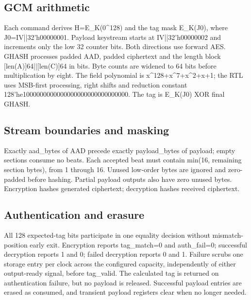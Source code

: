 \documentclass[11pt,a4paper]{article}
\begin{document}
\subsection{GCM arithmetic}

Each command derives H=\allowbreak{}E\_\allowbreak{}K(\allowbreak{}0\textasciicircum{}128)\allowbreak{} and the tag mask E\_\allowbreak{}K(\allowbreak{}J0)\allowbreak{},\allowbreak{} where J0=\allowbreak{}IV||32'h00000001. Payload keystream starts at IV||32'h00000002 and increments only the low 32 counter bits. Both directions use forward AES. GHASH processes padded AAD,\allowbreak{} padded ciphertext and the length block [\allowbreak{}len(\allowbreak{}A)\allowbreak{}]\allowbreak{}64||[\allowbreak{}len(\allowbreak{}C)\allowbreak{}]\allowbreak{}64 in bits. Byte counts are widened to 64 bits before multiplication by eight. The field polynomial is x\textasciicircum{}128+\allowbreak{}x\textasciicircum{}7+\allowbreak{}x\textasciicircum{}2+\allowbreak{}x+\allowbreak{}1; the RTL uses MSB-first processing,\allowbreak{} right shifts and reduction constant 128'he1000000000000000000000000000000. The tag is E\_\allowbreak{}K(\allowbreak{}J0)\allowbreak{} XOR final GHASH.

\subsection{Stream boundaries and masking}

Exactly aad\_\allowbreak{}bytes of AAD precede exactly payload\_\allowbreak{}bytes of payload; empty sections consume no beats. Each accepted beat must contain min(\allowbreak{}16,\allowbreak{} remaining section bytes)\allowbreak{},\allowbreak{} from 1 through 16. Unused low-order bytes are ignored and zero-padded before hashing. Partial payload outputs also have zero unused bytes. Encryption hashes generated ciphertext; decryption hashes received ciphertext.

\subsection{Authentication and erasure}

All 128 expected-tag bits participate in one equality decision without mismatch-position early exit. Encryption reports tag\_\allowbreak{}match=\allowbreak{}0 and auth\_\allowbreak{}fail=\allowbreak{}0; successful decryption reports 1 and 0; failed decryption reports 0 and 1. Failure scrubs one storage entry per clock across the configured capacity,\allowbreak{} independently of either output-ready signal,\allowbreak{} before tag\_\allowbreak{}valid. The calculated tag is returned on authentication failure,\allowbreak{} but no payload is released. Successful payload entries are erased as consumed,\allowbreak{} and transient payload registers clear when no longer needed.
\end{document}
